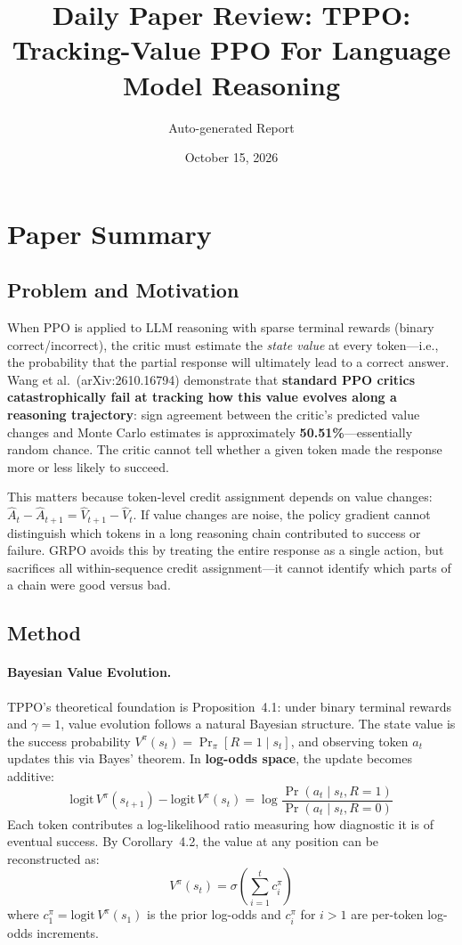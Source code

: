 \documentclass[11pt,a4paper]{article}
\title{Daily Paper Review: TPPO: Tracking-Value PPO For Language Model Reasoning}
\author{Auto-generated Report}
\date{October 15, 2026}
\begin{document}
\maketitle

\section{Paper Summary}

\subsection{Problem and Motivation}
When PPO is applied to LLM reasoning with sparse terminal rewards (binary correct/incorrect), the critic must estimate the \emph{state value} at every token---i.e., the probability that the partial response will ultimately lead to a correct answer. Wang et al.\ (arXiv:2610.16794) demonstrate that \textbf{standard PPO critics catastrophically fail at tracking how this value evolves along a reasoning trajectory}: sign agreement between the critic's predicted value changes and Monte Carlo estimates is approximately \textbf{50.51\%}---essentially random chance. The critic cannot tell whether a given token made the response more or less likely to succeed.

This matters because token-level credit assignment depends on value changes: $\hat{A}_t - \hat{A}_{t+1} = \hat{V}_{t+1} - \hat{V}_t$. If value changes are noise, the policy gradient cannot distinguish which tokens in a long reasoning chain contributed to success or failure. GRPO avoids this by treating the entire response as a single action, but sacrifices all within-sequence credit assignment---it cannot identify which parts of a chain were good versus bad.

\subsection{Method}
\paragraph{Bayesian Value Evolution.}
TPPO's theoretical foundation is Proposition~4.1: under binary terminal rewards and $\gamma{=}1$, value evolution follows a natural Bayesian structure. The state value is the success probability $V^\pi(s_t) = \Pr_\pi[R{=}1 \mid s_t]$, and observing token $a_t$ updates this via Bayes' theorem. In \textbf{log-odds space}, the update becomes additive:
\begin{equation}
\text{logit}\, V^\pi(s_{t+1}) - \text{logit}\, V^\pi(s_t) = \log \frac{\Pr(a_t \mid s_t, R{=}1)}{\Pr(a_t \mid s_t, R{=}0)}
\end{equation}
Each token contributes a log-likelihood ratio measuring how diagnostic it is of eventual success. By Corollary~4.2, the value at any position can be reconstructed as:
\begin{equation}
V^\pi(s_t) = \sigma\!\left(\sum_{i=1}^{t} c_i^\pi\right)
\end{equation}
where $c_1^\pi = \text{logit}\, V^\pi(s_1)$ is the prior log-odds and $c_i^\pi$ for $i > 1$ are per-token log-odds increments.
\end{document}
